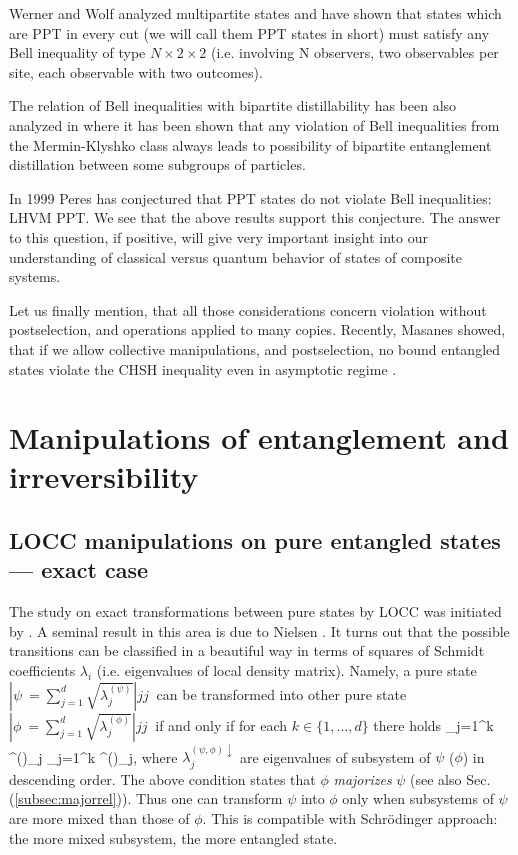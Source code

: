 \documentclass[twocolumn,aps,rmp]{revtex4}
\begin{document}
Werner and Wolf analyzed multipartite states
\cite{WernerW1999-PPTBell,WernerW2001-Bell-review} and have shown that
states which are PPT in every cut (we will call them PPT states in
short) must satisfy any Bell inequality of type $N \times 2 \times 2 $
(i.e. involving N observers, two observables per site, each observable
with two outcomes).

The relation of Bell inequalities with bipartite distillability has
been also analyzed in \cite{AcinGT2006-grot} where it has been shown
that any violation of Bell inequalities from the Mermin-Klyshko class
always leads to possibility of bipartite entanglement distillation
between some subgroups of particles.

In 1999 Peres has conjectured \cite{Peres1999-PPTBell} that PPT
states do not violate Bell inequalities: \be LHVM \Leftrightarrow
PPT. \label{Peres} \ee We see that the above results support
this conjecture. The answer to this question, if positive, will
give very important insight into our understanding of classical
versus quantum behavior of states of composite systems.

Let us finally mention, that all those considerations concern
violation without postselection, and operations applied to many
copies. Recently, Masanes showed, that if we allow collective
manipulations, and postselection, no bound entangled states violate
the CHSH inequality even in asymptotic regime \cite{Masanes}.


\section{Manipulations of entanglement and irreversibility}
\label{sec:irrev}
\subsection{LOCC manipulations on pure entangled states --- exact case}
\label{subsec:puretrans}
The study on exact transformations between pure states
by LOCC was initiated by \cite{LoPopsecu1997-beyond}.
A seminal result in this area is due to Nielsen \cite{Nielsen-pure-entanglement}. It turns out that the
possible transitions can be classified in a beautiful way in terms of
squares of Schmidt coefficients $\lambda_i$ (i.e. eigenvalues of
local density matrix).
Namely, a pure state $|\psi\>=\sum_{j=1}^d\sqrt{\lambda^{(\psi)}_j}|jj\>$ can be transformed into other pure state $|\phi\>=\sum_{j=1}^d\sqrt{\lambda^{(\phi)}_j}|jj\>$ if and only if for each $k \in \{1,\ldots,d\}$ there holds
\be
\sum_{j=1}^k \lambda^{(\psi)\downarrow}_j \leq  \sum_{j=1}^k \lambda^{(\phi)\downarrow}_j,
\label{eq:major}
\ee
where $\lambda^{(\psi,\phi)\downarrow}_j$ are eigenvalues of subsystem
of $\psi$ ($\phi$) in descending order.
The above condition states that $\phi$ {\it majorizes} $\psi$ (see also Sec. (\ref{subsec:majorrel})). Thus one can transform $\psi$ into $\phi$ only when subsystems of $\psi$  are more mixed than those of $\phi$. This is compatible with Schr{\"o}dinger approach: the more mixed subsystem, the more entangled state.
\end{document}

